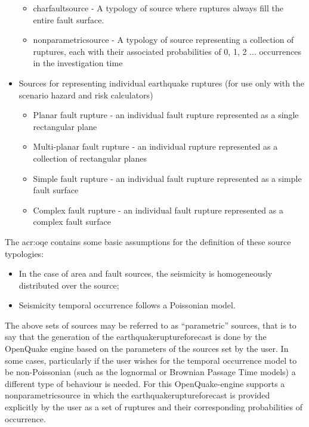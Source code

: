 \begin{itemize}
\begin{itemize}
        \item \Gls{charfaultsource} - A typology of source where ruptures
        always fill the entire fault surface.
        
        \item \Gls{nonparametricsource} - A typology of source representing a collection of ruptures, each with their associated probabilities of 0, 1, 2 ... occurrences in the investigation time

    \end{itemize}

    \item Sources for representing individual earthquake ruptures (for use only with the scenario hazard and risk calculators)
    
    \begin{itemize}
        \item Planar fault rupture - an individual fault rupture represented as a single rectangular plane
        \item Multi-planar fault rupture - an individual rupture represented as a collection of rectangular planes
        \item Simple fault rupture - an individual fault rupture represented as a simple fault surface
        \item Complex fault rupture - an individual fault rupture represented as a complex fault surface
    \end{itemize}

\end{itemize}

The \glsdesc{acr:oqe} contains some basic assumptions for the definition of
these source typologies:

\begin{itemize}

    \item In the case of area and fault sources, the seismicity is
    homogeneously distributed over the source;

    \item Seismicity temporal occurrence follows a Poissonian model.

\end{itemize}

The above sets of sources may be referred to as ``parametric'' sources, that is to say that the generation of the \Gls{earthquakeruptureforecast} is done by the OpenQuake engine based on the parameters of the sources set by the user. In some cases, particularly if the user wishes for the temporal occurrence model to be non-Poissonian (such as the lognormal or Brownian Passage Time models) a different type of behaviour is needed. For this OpenQuake-engine supports a \Gls{nonparametricsource} in which the \Gls{earthquakeruptureforecast} is provided explicitly by the user as a set of ruptures and their corresponding probabilities of occurrence.

